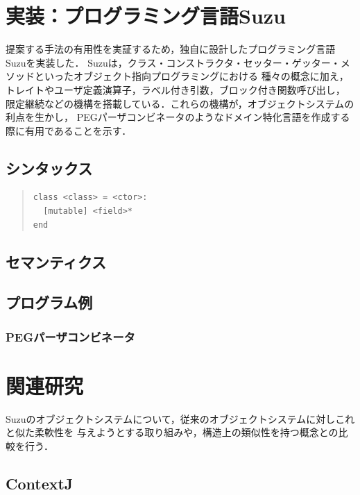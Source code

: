 \documentclass{ipsjprosym}
\begin{document}
\section{実装：プログラミング言語Suzu}
\label{sec:implementation}

提案する手法の有用性を実証するため，独自に設計したプログラミング言語Suzuを実装した．
Suzuは，クラス・コンストラクタ・セッター・ゲッター・メソッドといったオブジェクト指向プログラミングにおける
種々の概念に加え，トレイトやユーザ定義演算子，ラベル付き引数，ブロック付き関数呼び出し，
限定継続などの機構を搭載している．これらの機構が，オブジェクトシステムの利点を生かし，
PEGパーザコンビネータのようなドメイン特化言語を作成する際に有用であることを示す．

\subsection{シンタックス}

\begin{quote}
\small
\begin{verbatim}
class <class> = <ctor>:
  [mutable] <field>*
end
\end{verbatim}
\end{quote}

\subsection{セマンティクス}

\subsection{プログラム例}

\subsubsection{PEGパーザコンビネータ}

\section{関連研究}

Suzuのオブジェクトシステムについて，従来のオブジェクトシステムに対しこれと似た柔軟性を
与えようとする取り組みや，構造上の類似性を持つ概念との比較を行う．

\subsection{ContextJ}
\end{document}
